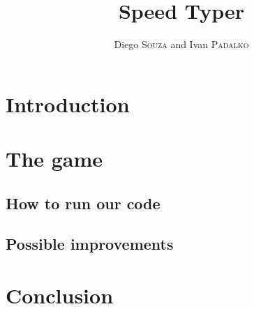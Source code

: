 \documentclass[a4paper,12pt,twoside]{article}
\title{Speed Typer}
\author{Diego \textsc{Souza} and Ivan \textsc{Padalko}}
\date{}
\begin{document}
	\maketitle
	
	\tableofcontents
	\newpage
	
	\section{Introduction}
		
	\section{The game}
		
		\subsection{How to run our code}
		
		\subsection{Possible improvements}
		
	\section{Conclusion}
	
\end{document}

